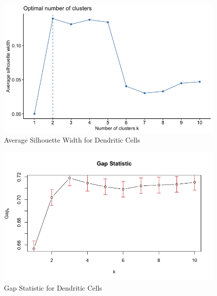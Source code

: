 \documentclass{article}
\begin{document}
\begin{figure}[H]
\centering
\includegraphics[scale=0.5]{PBCells_silhouette}
\caption{Average Silhouette Width for Dendritic Cells}
\end{figure}

\begin{figure}[H]
\centering
\includegraphics[scale=0.5]{PBCells_gap}
\caption{Gap Statistic for Dendritic Cells}
\end{figure}

\newpage


\end{document}
